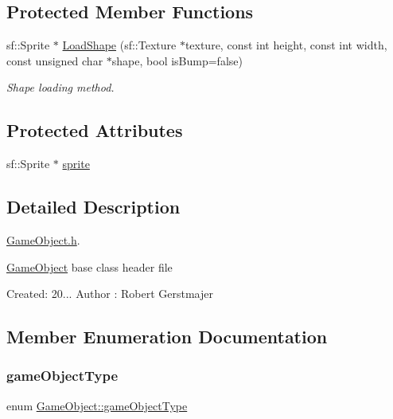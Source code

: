 \subsection*{Protected Member Functions}
\begin{DoxyCompactItemize}
\item 
sf\+::\+Sprite $\ast$ \mbox{\hyperlink{class_game_object_ab570c73233f2e8eb9fb3c043b1a68c4c}{Load\+Shape}} (sf\+::\+Texture $\ast$texture, const int height, const int width, const unsigned char $\ast$shape, bool is\+Bump=false)
\begin{DoxyCompactList}\small\item\em Shape loading method. \end{DoxyCompactList}\end{DoxyCompactItemize}
\subsection*{Protected Attributes}
\begin{DoxyCompactItemize}
\item 
sf\+::\+Sprite $\ast$ \mbox{\hyperlink{class_game_object_ac965ec6e2eba11bb1be2ecba57508329}{sprite}}
\end{DoxyCompactItemize}


\subsection{Detailed Description}
\mbox{\hyperlink{_game_object_8h}{Game\+Object.\+h}}. 

\mbox{\hyperlink{class_game_object}{Game\+Object}} base class header file

Created\+: 20... Author \+: Robert Gerstmajer 

\subsection{Member Enumeration Documentation}
\mbox{\label{class_game_object_ad5092169e581fb0772e01026882ea0c8}} 
\subsubsection{\texorpdfstring{game\+Object\+Type}{gameObjectType}}
{\footnotesize\ttfamily enum \mbox{\hyperlink{class_game_object_ad5092169e581fb0772e01026882ea0c8}{Game\+Object\+::game\+Object\+Type}}\hspace{0.3cm}{\ttfamily [protected]}}

